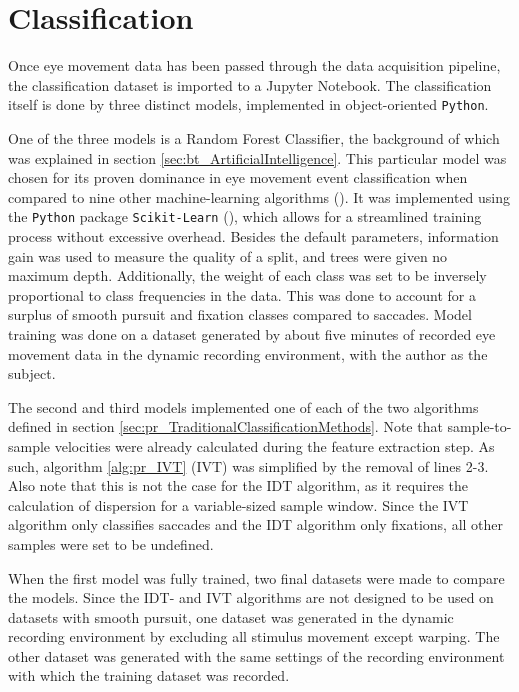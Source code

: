 \section{Classification} \label{sec:meth_Classification} 

Once eye movement data has been passed through the data acquisition pipeline, the classification dataset is imported to a Jupyter Notebook. The classification itself is done by three distinct models, implemented in object-oriented \texttt{Python}. 

One of the three models is a Random Forest Classifier, the background of which was explained in section \ref{sec:bt_ArtificialIntelligence}. This particular model was chosen for its proven dominance in eye movement event classification when compared to nine other machine-learning algorithms (\cite{zemblys2016}). It was implemented using the \texttt{Python} package \texttt{Scikit-Learn} (\cite{scikit-learn}), which allows for a streamlined training process without excessive overhead. Besides the default parameters, information gain was used to measure the quality of a split, and trees were given no maximum depth. Additionally, the weight of each class was set to be inversely proportional to class frequencies in the data. This was done to account for a surplus of smooth pursuit and fixation classes compared to saccades. Model training was done on a dataset generated by about five minutes of recorded eye movement data in the dynamic recording environment, with the author as the subject. 

The second and third models implemented one of each of the two algorithms defined in section \ref{sec:pr_TraditionalClassificationMethods}. Note that sample-to-sample velocities were already calculated during the feature extraction step. As such, algorithm \ref{alg:pr_IVT} (IVT) was simplified by the removal of lines 2-3. Also note that this is not the case for the IDT algorithm, as it requires the calculation of dispersion for a variable-sized sample window. Since the IVT algorithm only classifies saccades and the IDT algorithm only fixations, all other samples were set to be undefined.

When the first model was fully trained, two final datasets were made to compare the models. Since the IDT- and IVT algorithms are not designed to be used on datasets with smooth pursuit, one dataset was generated in the dynamic recording environment by excluding all stimulus movement except warping. The other dataset was generated with the same settings of the recording environment with which the training dataset was recorded. 